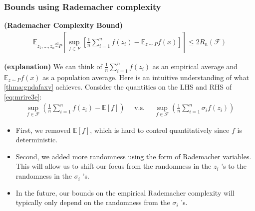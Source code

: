 \documentclass{article}
\newcommand{\bfs}[1]{\textbf{({#1}) }}
\begin{document}
\subsubsection{Bounds using Rademacher complexity}\label{sssec:gmrdrfer}
\begin{thma}\bfs{Rademacher Complexity Bound}\label{thma:gndafaxv}
\begin{align}
\mathbb{E}_{z_{1}, \ldots, z_{n}{\stackrel{\mathrm{iid}}{\sim}}P} \left[\sup _{f \in F}\left[\frac{1}{n} \sum_{i=1}^{n} f\left(z_{i}\right)-\mathbb{E}_{z \sim P} f(x)\right]\right] \leq 2 R_{n}(\mathcal{F})\label{eq:mrire3e}
\end{align}
\end{thma}

\begin{rema}\bfs{explanation}
We can think of $\frac{1}{n} \sum_{i=1}^{n} f\left(z_{i}\right)$ as an empirical average and $\mathbb{E}_{z \sim P} f(x)$ as a population average. Here is an intuitive understanding of what \cref{thma:gndafaxv}  achieves. Consider the quantities on the LHS and RHS of \cref{eq:mrire3e}:
\begin{align*}
\sup _{f \in \mathcal{F}}\left(\frac{1}{n} \sum_{i=1}^{n} f\left(z_{i}\right)-\mathbb{E}[f]\right) \quad \text { v.s. } \quad \sup _{f \in \mathcal{F}}\left(\frac{1}{n} \sum_{i=1}^{n} \sigma_{i} f\left(z_{i}\right)\right)
\end{align*}

\begin{itemize}
    \item First, we removed $\mathbb{E}[f]$, which is hard to control quantitatively since $f$ is deterministic. 
    \item Second, we added more randomness using the form of Rademacher variables. This will allow us to shift our focus from the randomness in the $z_{i}$ 's to the randomness in the $\sigma_{i}$ 's.
    \item  In the future, our bounds on the empirical Rademacher complexity will typically only depend on the randomness from the $\sigma_{i}$ 's.
\end{itemize}
\end{rema}
\end{document}
